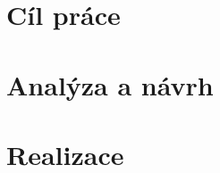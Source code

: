\documentclass[thesis=B,czech]{FITthesis}[2012/06/26]
\begin{document}
\chapter{Cíl práce}
	
\chapter{Analýza a návrh}
	
	
	
	
	
	
	
\chapter{Realizace}
	
	
\end{document}
